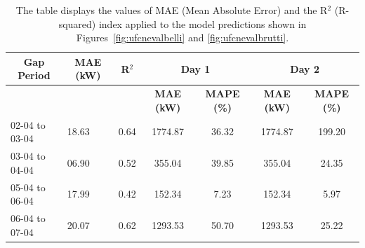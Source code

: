 \begin{table}[H]
	\begin{center}
		\begin{tabular}[c]{l|l|l|c|c|c|c}
			\multicolumn{1}{c|}{\textbf{Gap Period}} &
			\multicolumn{1}{c|}{\textbf{MAE (kW)}}   &
			\multicolumn{1}{c|}{\textbf{R}$^2$}      &
			\multicolumn{2}{c|}{\textbf{Day 1}}      &
			\multicolumn{2}{c}{\textbf{Day 2}}                                                                                                                                \\
			\hline

			                                         &       &      & \tiny \textbf{MAE (kW)} & \tiny \textbf{MAPE (\%)} & \tiny \textbf{MAE (kW)} & \tiny \textbf{MAPE (\%)} \\
			02-04 to 03-04                           & 18.63 & 0.64 & 1774.87                 & 36.32                    & 1774.87                 & 199.20                   \\
			03-04 to 04-04                           & 06.90 & 0.52 & 355.04                  & 39.85                    & 355.04                  & 24.35                    \\
			05-04 to 06-04                           & 17.99 & 0.42 & 152.34                  & 7.23                     & 152.34                  & 5.97                     \\
			06-04 to 07-04                           & 20.07 & 0.62 & 1293.53                 & 50.70                    & 1293.53                 & 25.22                    \\
		\end{tabular}
	\end{center}
	\caption{The table displays the values of MAE (Mean Absolute Error) and the R$^2$ (R-squared) index applied to the model predictions shown in Figures~\ref{fig:ufcnevalbelli} and \ref{fig:ufcnevalbrutti}.}
\end{table}

